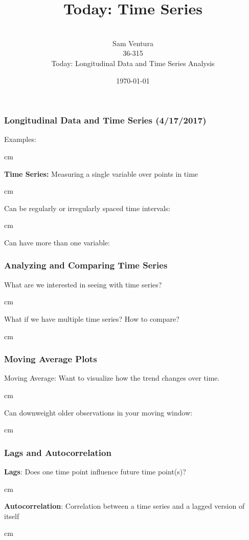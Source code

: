 \documentclass{beamer} %
\begin{document}
\title[dedup]{Today:  Time Series}


\author[Samuel L. Ventura]{\\
  \large{Sam Ventura\\36-315\\Today:  Longitudinal Data and Time Series Analysis}}
\date{\today}


\begin{frame}
	\maketitle

	
\end{frame}


\begin{frame}\frametitle{Longitudinal Data and Time Series (4/17/2017)}
	\small
	
	Examples:
	
	 cm
	
	\textbf{Time Series:}  Measuring a single variable over points in time
	
	 cm
	
	Can be regularly or irregularly spaced time intervals:
	
	 cm
	
	Can have more than one variable:
	
	
\end{frame}


\begin{frame}\frametitle{Analyzing and Comparing Time Series}
	\small
	
	What are we interested in seeing with time series?
	
	 cm
	
	What if we have multiple time series?  How to compare?
	
	 cm
	
\end{frame}




\begin{frame}\frametitle{Moving Average Plots}
	\small
	
	Moving Average:  Want to visualize how the trend changes over time.
	
	 cm
	
	Can downweight older observations in your moving window:
	
	 cm
	
\end{frame}




\begin{frame}\frametitle{Lags and Autocorrelation}
	\small
	
	\textbf{Lags}:  Does one time point influence future time point(s)?
	
	 cm
	
	\textbf{Autocorrelation}:  Correlation between a time series and a lagged version of itself
	
	 cm
	
	
	
	
\end{frame}
\end{document}

